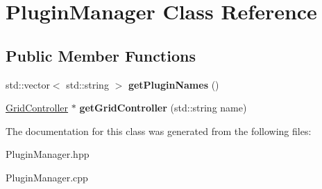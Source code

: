 \hypertarget{classPluginManager}{\section{Plugin\+Manager Class Reference}
\label{classPluginManager}
}
\subsection*{Public Member Functions}
\begin{DoxyCompactItemize}
\item 
\hypertarget{classPluginManager_a9d5df2a987443d7f13e93df5a4cf867d}{std\+::vector$<$ std\+::string $>$ {\bfseries get\+Plugin\+Names} ()}\label{classPluginManager_a9d5df2a987443d7f13e93df5a4cf867d}

\item 
\hypertarget{classPluginManager_a31314d0f032d547b32517cfc4fa1cd0e}{\hyperlink{classGridController}{Grid\+Controller} $\ast$ {\bfseries get\+Grid\+Controller} (std\+::string name)}\label{classPluginManager_a31314d0f032d547b32517cfc4fa1cd0e}

\end{DoxyCompactItemize}


The documentation for this class was generated from the following files\+:\begin{DoxyCompactItemize}
\item 
Plugin\+Manager.\+hpp\item 
Plugin\+Manager.\+cpp\end{DoxyCompactItemize}
